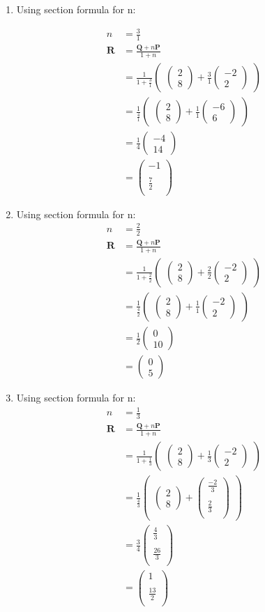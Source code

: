 \documentclass[12pt]{article}
\newcommand{\myvec}[1]{\ensuremath{\begin{pmatrix}#1\end{pmatrix}}}
\let\vec\mathbf
\begin{document}
\begin{enumerate}

\item Using section formula for n:
    
\begin{align}
n&=\frac{3}{1}\\
\vec{R}&=\frac{\vec{Q}+n\vec{P}}{1+n}\\
&=\frac{1}{1+\frac{3}{1}}  \myvec{\myvec{
2\\
8
}
  +
   \frac{3}{1}\myvec{
-2\\
2
}}\\
&= \frac{1}{\frac{4}{1}} \myvec{\myvec{
2\\
8
}
  +
\frac{1}{1}\myvec{
-6\\
6
}} \\
&=\frac{1}{4}
\myvec{
-4\\
14
}\\
&=\myvec{
-1\\
\\
\frac{7}{2}\\
}
\end{align}

\item Using section formula for n:
\begin{align}
n&=\frac{2}{2}\\
\vec{R}&=\frac{\vec{Q}+n\vec{P}}{1+n}\\
&=\frac{1}{1+\frac{2}{2}}  \myvec{\myvec{
2\\
8
}
  +
   \frac{2}{2}\myvec{
-2\\
2
}}\\
&= \frac{1}{\frac{4}{2}} \myvec{\myvec{
2\\
8
}
  +
\frac{1}{1}\myvec{
-2\\
2
}} \\
&=\frac{1}{2}
\myvec{
0\\
10
}\\
&=\myvec{
0\\
5
}
\end{align}

\item Using section formula for n:
\begin{align}
n&=\frac{1}{3}\\
\vec{R}&=\frac{\vec{Q}+n\vec{P}}{1+n}\\
&=\frac{1}{1+\frac{1}{3}}  \myvec{\myvec{
2\\
8
}
  +
   \frac{1}{3}\myvec{
-2\\
2
}}\\
&= \frac{1}{\frac{4}{3}} \myvec{\myvec{
2\\
8
}
  +
\myvec{
\frac{-2}{3}\\
\\
\frac{2}{3}\\
}} \\
&=\frac{3}{4}
\myvec{
\frac{4}{3}\\
\\
\frac{26}{3}\\
}\\
&=\myvec{
1\\
\\
\frac{13}{2}\\
}
\end{align}


\end{enumerate}
\end{document}
